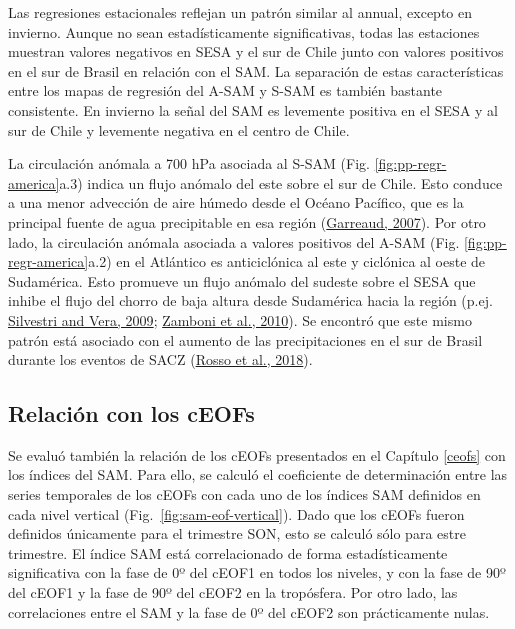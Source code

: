 \documentclass[12pt,oneside,a4paper]{reedthesis}
\begin{document}
Las regresiones estacionales reflejan un patrón similar al annual, excepto en invierno.
Aunque no sean estadísticamente significativas, todas las estaciones muestran valores negativos en SESA y el sur de Chile junto con valores positivos en el sur de Brasil en relación con el SAM.
La separación de estas características entre los mapas de regresión del A-SAM y S-SAM es también bastante consistente.
En invierno la señal del SAM es levemente positiva en el SESA y al sur de Chile y levemente negativa en el centro de Chile.

La circulación anómala a 700 hPa asociada al S-SAM (Fig. \ref{fig:pp-regr-america}a.3) indica un flujo anómalo del este sobre el sur de Chile.
Esto conduce a una menor advección de aire húmedo desde el Océano Pacífico, que es la principal fuente de agua precipitable en esa región (\protect\hyperlink{ref-garreaud2007}{Garreaud, 2007}).
Por otro lado, la circulación anómala asociada a valores positivos del A-SAM (Fig. \ref{fig:pp-regr-america}a.2) en el Atlántico es anticiclónica al este y ciclónica al oeste de Sudamérica.
Esto promueve un flujo anómalo del sudeste sobre el SESA que inhibe el flujo del chorro de baja altura desde Sudamérica hacia la región (p.ej. \protect\hyperlink{ref-silvestri2009}{Silvestri and Vera, 2009}; \protect\hyperlink{ref-zamboni2010}{Zamboni et al., 2010}).
Se encontró que este mismo patrón está asociado con el aumento de las precipitaciones en el sur de Brasil durante los eventos de SACZ (\protect\hyperlink{ref-rosso2018}{Rosso et al., 2018}).

\hypertarget{sam-ceof}{%
\subsection{Relación con los cEOFs}\label{sam-ceof}}

Se evaluó también la relación de los cEOFs presentados en el Capítulo \ref{ceofs} con los índices del SAM.
Para ello, se calculó el coeficiente de determinación entre las series temporales de los cEOFs con cada uno de los índices SAM definidos en cada nivel vertical (Fig.~\ref{fig:sam-eof-vertical}).
Dado que los cEOFs fueron definidos únicamente para el trimestre SON, esto se calculó sólo para estre trimestre.
El índice SAM está correlacionado de forma estadísticamente significativa con la fase de 0º del cEOF1 en todos los niveles, y con la fase de 90º del cEOF1 y la fase de 90º del cEOF2 en la tropósfera.
Por otro lado, las correlaciones entre el SAM y la fase de 0º del cEOF2 son prácticamente nulas.
\end{document}
